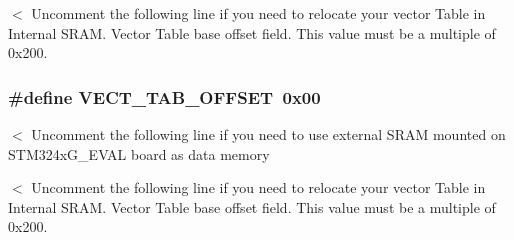 $<$ Uncomment the following line if you need to relocate your vector Table in Internal S\-R\-A\-M. Vector Table base offset field. This value must be a multiple of 0x200. \hypertarget{group___s_t_m32_f4xx___system___private___defines_ga40e1495541cbb4acbe3f1819bd87a9fe}{
\subsubsection[{V\-E\-C\-T\-\_\-\-T\-A\-B\-\_\-\-O\-F\-F\-S\-E\-T}]{\setlength{\rightskip}{0pt plus 5cm}\#define V\-E\-C\-T\-\_\-\-T\-A\-B\-\_\-\-O\-F\-F\-S\-E\-T~0x00}}\label{group___s_t_m32_f4xx___system___private___defines_ga40e1495541cbb4acbe3f1819bd87a9fe}
$<$ Uncomment the following line if you need to use external S\-R\-A\-M mounted on S\-T\-M324x\-G\-\_\-\-E\-V\-A\-L board as data memory

$<$ Uncomment the following line if you need to relocate your vector Table in Internal S\-R\-A\-M. Vector Table base offset field. This value must be a multiple of 0x200. 